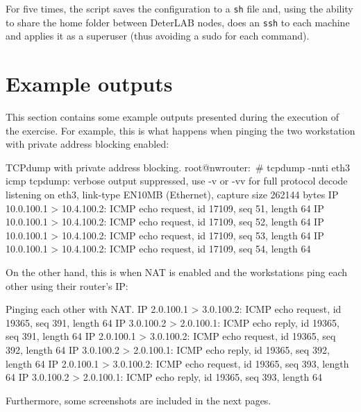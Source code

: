 \documentclass[a4paper,11pt,hidelinks]{article}
\begin{document}
For five times, the script saves the configuration to a \verb=sh= file and, using the ability to share the home folder between DeterLAB nodes, does an \verb=ssh= to each machine and applies it as a superuser (thus avoiding a sudo for each command).

\section{Example outputs}

This section contains some example outputs presented during the execution of the exercise. For example, this is what happens when pinging the two workstation with private address blocking enabled:

\begin{code}{TCPdump with private address blocking.}
root@nwrouter:~# tcpdump -nnti eth3 icmp
tcpdump: verbose output suppressed, use -v or -vv for full protocol decode
listening on eth3, link-type EN10MB (Ethernet), capture size 262144 bytes
IP 10.0.100.1 > 10.4.100.2: ICMP echo request, id 17109, seq 51, length 64
IP 10.0.100.1 > 10.4.100.2: ICMP echo request, id 17109, seq 52, length 64
IP 10.0.100.1 > 10.4.100.2: ICMP echo request, id 17109, seq 53, length 64
IP 10.0.100.1 > 10.4.100.2: ICMP echo request, id 17109, seq 54, length 64
\end{code}

On the other hand, this is when NAT is enabled and the workstations ping each other using their router's IP:

\begin{code}{Pinging each other with NAT.}
IP 2.0.100.1 > 3.0.100.2: ICMP echo request, id 19365, seq 391, length 64
IP 3.0.100.2 > 2.0.100.1: ICMP echo reply, id 19365, seq 391, length 64
IP 2.0.100.1 > 3.0.100.2: ICMP echo request, id 19365, seq 392, length 64
IP 3.0.100.2 > 2.0.100.1: ICMP echo reply, id 19365, seq 392, length 64
IP 2.0.100.1 > 3.0.100.2: ICMP echo request, id 19365, seq 393, length 64
IP 3.0.100.2 > 2.0.100.1: ICMP echo reply, id 19365, seq 393, length 64
\end{code}

Furthermore, some screenshots are included in the next pages.
\end{document}
